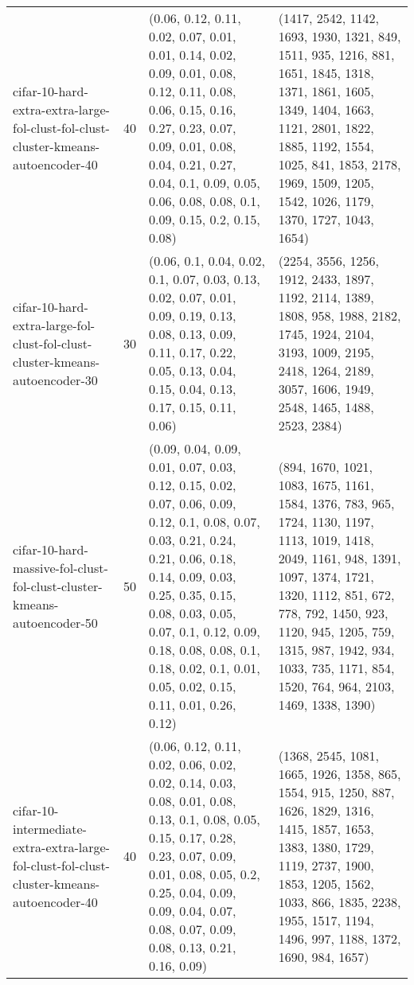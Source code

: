\begin{longtable}{llll}
                            cifar-10-hard-extra-extra-large-fol-clust-fol-clust-cluster-kmeans-autoencoder-40 &             40 &                                                             (0.06, 0.12, 0.11, 0.02, 0.07, 0.01, 0.01, 0.14, 0.02, 0.09, 0.01, 0.08, 0.12, 0.11, 0.08, 0.06, 0.15, 0.16, 0.27, 0.23, 0.07, 0.09, 0.01, 0.08, 0.04, 0.21, 0.27, 0.04, 0.1, 0.09, 0.05, 0.06, 0.08, 0.08, 0.1, 0.09, 0.15, 0.2, 0.15, 0.08) &                                                              (1417, 2542, 1142, 1693, 1930, 1321, 849, 1511, 935, 1216, 881, 1651, 1845, 1318, 1371, 1861, 1605, 1349, 1404, 1663, 1121, 2801, 1822, 1885, 1192, 1554, 1025, 841, 1853, 2178, 1969, 1509, 1205, 1542, 1026, 1179, 1370, 1727, 1043, 1654) \\
                                  cifar-10-hard-extra-large-fol-clust-fol-clust-cluster-kmeans-autoencoder-30 &             30 &                                                                                                                        (0.06, 0.1, 0.04, 0.02, 0.1, 0.07, 0.03, 0.13, 0.02, 0.07, 0.01, 0.09, 0.19, 0.13, 0.08, 0.13, 0.09, 0.11, 0.17, 0.22, 0.05, 0.13, 0.04, 0.15, 0.04, 0.13, 0.17, 0.15, 0.11, 0.06) &                                                                                                                       (2254, 3556, 1256, 1912, 2433, 1897, 1192, 2114, 1389, 1808, 958, 1988, 2182, 1745, 1924, 2104, 3193, 1009, 2195, 2418, 1264, 2189, 3057, 1606, 1949, 2548, 1465, 1488, 2523, 2384) \\
                                      cifar-10-hard-massive-fol-clust-fol-clust-cluster-kmeans-autoencoder-50 &             50 &  (0.09, 0.04, 0.09, 0.01, 0.07, 0.03, 0.12, 0.15, 0.02, 0.07, 0.06, 0.09, 0.12, 0.1, 0.08, 0.07, 0.03, 0.21, 0.24, 0.21, 0.06, 0.18, 0.14, 0.09, 0.03, 0.25, 0.35, 0.15, 0.08, 0.03, 0.05, 0.07, 0.1, 0.12, 0.09, 0.18, 0.08, 0.08, 0.1, 0.18, 0.02, 0.1, 0.01, 0.05, 0.02, 0.15, 0.11, 0.01, 0.26, 0.12) &               (894, 1670, 1021, 1083, 1675, 1161, 1584, 1376, 783, 965, 1724, 1130, 1197, 1113, 1019, 1418, 2049, 1161, 948, 1391, 1097, 1374, 1721, 1320, 1112, 851, 672, 778, 792, 1450, 923, 1120, 945, 1205, 759, 1315, 987, 1942, 934, 1033, 735, 1171, 854, 1520, 764, 964, 2103, 1469, 1338, 1390) \\
                    cifar-10-intermediate-extra-extra-large-fol-clust-fol-clust-cluster-kmeans-autoencoder-40 &             40 &                                                            (0.06, 0.12, 0.11, 0.02, 0.06, 0.02, 0.02, 0.14, 0.03, 0.08, 0.01, 0.08, 0.13, 0.1, 0.08, 0.05, 0.15, 0.17, 0.28, 0.23, 0.07, 0.09, 0.01, 0.08, 0.05, 0.2, 0.25, 0.04, 0.09, 0.09, 0.04, 0.07, 0.08, 0.07, 0.09, 0.08, 0.13, 0.21, 0.16, 0.09) &                                                                (1368, 2545, 1081, 1665, 1926, 1358, 865, 1554, 915, 1250, 887, 1626, 1829, 1316, 1415, 1857, 1653, 1383, 1380, 1729, 1119, 2737, 1900, 1853, 1205, 1562, 1033, 866, 1835, 2238, 1955, 1517, 1194, 1496, 997, 1188, 1372, 1690, 984, 1657) \\

\end{longtable}
